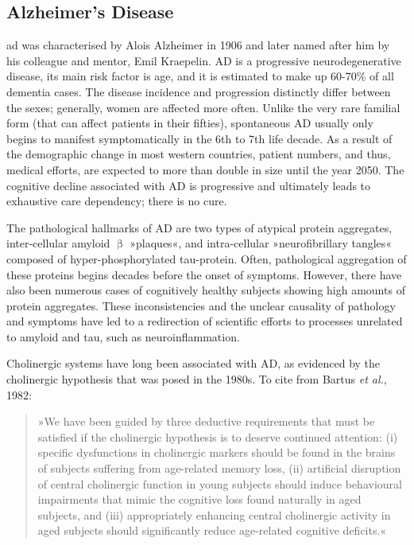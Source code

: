 \subsection{Alzheimer's Disease}
\ac{ad} was characterised by Alois Alzheimer in 1906 and later named after him by his colleague and mentor, Emil Kraepelin.\cite{Berrios1990} AD is a progressive neurodegenerative disease, its main risk factor is age, and it is estimated to make up 60-70\% of all dementia cases. The disease incidence and progression distinctly differ between the sexes;\cite{Miech2002} generally, women are affected more often. Unlike the very rare familial form (that can affect patients in their fifties), spontaneous AD usually only begins to manifest symptomatically in the 6th to 7th life decade. As a result of the demographic change in most western countries, patient numbers, and thus, medical efforts, are expected to more than double in size until the year 2050. The cognitive decline associated with AD is progressive and ultimately leads to exhaustive care dependency; there is no cure.

The pathological hallmarks of AD are two types of atypical protein aggregates, inter-cellular amyloid $\upbeta$ »plaques«, and intra-cellular »neurofibrillary tangles« composed of hyper-phosphorylated tau-protein. Often, pathological aggregation of these proteins begins decades before the onset of symptoms. However, there have also been numerous cases of cognitively healthy subjects showing high amounts of protein aggregates. These inconsistencies and the unclear causality of pathology and symptoms have led to a redirection of scientific efforts to processes unrelated to amyloid and tau, such as neuroinflammation.

Cholinergic systems have long been associated with AD, as evidenced by the cholinergic hypothesis that was posed in the 1980s. To cite from Bartus \emph{et al.}, 1982:\cite{Bartus1982}

\begin{quote}
»We have been guided by three deductive requirements that must be satisfied if the cholinergic hypothesis is to deserve continued attention: (i) specific dysfunctions in cholinergic markers should be found in the brains of subjects suffering from age-related memory loss, (ii) artificial disruption of central cholinergic function in young subjects should induce behavioural impairments that mimic the cognitive loss found naturally in aged subjects, and (iii) appropriately enhancing central cholinergic activity in aged subjects should significantly reduce age-related cognitive deficits.«
\end{quote}

